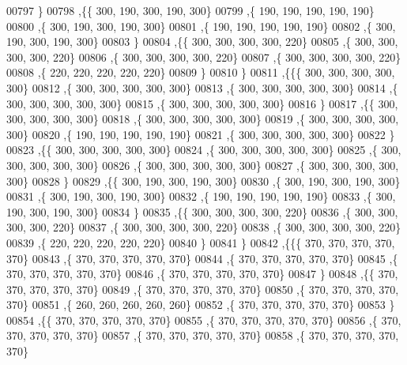 \begin{DoxyCode}
00797    \}
00798   ,\{\{   300,   190,   300,   190,   300\}
00799    ,\{   190,   190,   190,   190,   190\}
00800    ,\{   300,   190,   300,   190,   300\}
00801    ,\{   190,   190,   190,   190,   190\}
00802    ,\{   300,   190,   300,   190,   300\}
00803    \}
00804   ,\{\{   300,   300,   300,   300,   220\}
00805    ,\{   300,   300,   300,   300,   220\}
00806    ,\{   300,   300,   300,   300,   220\}
00807    ,\{   300,   300,   300,   300,   220\}
00808    ,\{   220,   220,   220,   220,   220\}
00809    \}
00810   \}
00811  ,\{\{\{   300,   300,   300,   300,   300\}
00812    ,\{   300,   300,   300,   300,   300\}
00813    ,\{   300,   300,   300,   300,   300\}
00814    ,\{   300,   300,   300,   300,   300\}
00815    ,\{   300,   300,   300,   300,   300\}
00816    \}
00817   ,\{\{   300,   300,   300,   300,   300\}
00818    ,\{   300,   300,   300,   300,   300\}
00819    ,\{   300,   300,   300,   300,   300\}
00820    ,\{   190,   190,   190,   190,   190\}
00821    ,\{   300,   300,   300,   300,   300\}
00822    \}
00823   ,\{\{   300,   300,   300,   300,   300\}
00824    ,\{   300,   300,   300,   300,   300\}
00825    ,\{   300,   300,   300,   300,   300\}
00826    ,\{   300,   300,   300,   300,   300\}
00827    ,\{   300,   300,   300,   300,   300\}
00828    \}
00829   ,\{\{   300,   190,   300,   190,   300\}
00830    ,\{   300,   190,   300,   190,   300\}
00831    ,\{   300,   190,   300,   190,   300\}
00832    ,\{   190,   190,   190,   190,   190\}
00833    ,\{   300,   190,   300,   190,   300\}
00834    \}
00835   ,\{\{   300,   300,   300,   300,   220\}
00836    ,\{   300,   300,   300,   300,   220\}
00837    ,\{   300,   300,   300,   300,   220\}
00838    ,\{   300,   300,   300,   300,   220\}
00839    ,\{   220,   220,   220,   220,   220\}
00840    \}
00841   \}
00842  ,\{\{\{   370,   370,   370,   370,   370\}
00843    ,\{   370,   370,   370,   370,   370\}
00844    ,\{   370,   370,   370,   370,   370\}
00845    ,\{   370,   370,   370,   370,   370\}
00846    ,\{   370,   370,   370,   370,   370\}
00847    \}
00848   ,\{\{   370,   370,   370,   370,   370\}
00849    ,\{   370,   370,   370,   370,   370\}
00850    ,\{   370,   370,   370,   370,   370\}
00851    ,\{   260,   260,   260,   260,   260\}
00852    ,\{   370,   370,   370,   370,   370\}
00853    \}
00854   ,\{\{   370,   370,   370,   370,   370\}
00855    ,\{   370,   370,   370,   370,   370\}
00856    ,\{   370,   370,   370,   370,   370\}
00857    ,\{   370,   370,   370,   370,   370\}
00858    ,\{   370,   370,   370,   370,   370\}

\end{DoxyCode}
